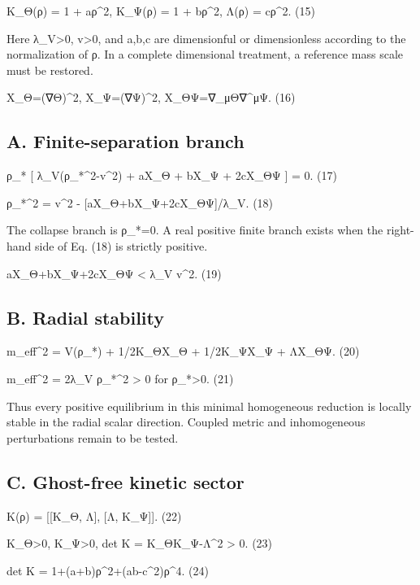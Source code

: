 K\_Θ(ρ) = 1 + aρ\^{}2, K\_Ψ(ρ) = 1 + bρ\^{}2, Λ(ρ) = cρ\^{}2. (15)

Here λ\_V\textgreater0, v\textgreater0, and a,b,c are dimensionful or
dimensionless according to the normalization of ρ. In a complete
dimensional treatment, a reference mass scale must be restored.

X\_Θ=(∇Θ)\^{}2, X\_Ψ=(∇Ψ)\^{}2, X\_ΘΨ=∇\_μΘ∇\^{}μΨ. (16)

\subsection{A. Finite-separation
branch}\label{a.-finite-separation-branch}

ρ\_* {[} λ\_V(ρ\_*\^{}2-v\^{}2) + aX\_Θ + bX\_Ψ + 2cX\_ΘΨ {]} = 0. (17)

ρ\_*\^{}2 = v\^{}2 - {[}aX\_Θ+bX\_Ψ+2cX\_ΘΨ{]}/λ\_V. (18)

The collapse branch is ρ\_*=0. A real positive finite branch exists when
the right-hand side of Eq. (18) is strictly positive.

aX\_Θ+bX\_Ψ+2cX\_ΘΨ \textless{} λ\_V v\^{}2. (19)

\subsection{B. Radial stability}\label{b.-radial-stability}

m\_eff\^{}2 = V\textquotesingle\textquotesingle(ρ\_*) +
1/2K\_Θ\textquotesingle\textquotesingle X\_Θ +
1/2K\_Ψ\textquotesingle\textquotesingle X\_Ψ +
Λ\textquotesingle\textquotesingle X\_ΘΨ. (20)

m\_eff\^{}2 = 2λ\_V ρ\_*\^{}2 \textgreater{} 0 for ρ\_*\textgreater0.
(21)

Thus every positive equilibrium in this minimal homogeneous reduction is
locally stable in the radial scalar direction. Coupled metric and
inhomogeneous perturbations remain to be tested.

\subsection{C. Ghost-free kinetic
sector}\label{c.-ghost-free-kinetic-sector}

K(ρ) = {[}{[}K\_Θ, Λ{]}, {[}Λ, K\_Ψ{]}{]}. (22)

K\_Θ\textgreater0, K\_Ψ\textgreater0, det K = K\_ΘK\_Ψ-Λ\^{}2
\textgreater{} 0. (23)

det K = 1+(a+b)ρ\^{}2+(ab-c\^{}2)ρ\^{}4. (24)

